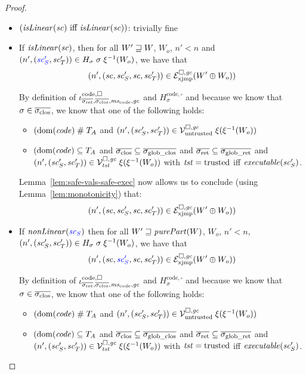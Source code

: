 \documentclass[a4paper]{article}
\begin{document}
\begin{proof}
\begin{itemize}
\begin{itemize}
   \item $(\isLinear{\vsc} \text{ iff } \isLinear{\vsc})$: trivially fine
      
   \item If $\isLinear{\vsc}$, then 
     for all $W' \future W$, $W_o$, $n' < n$ and $\npair[n']{\stpair[.]{\vsc_S'}{\vsc'_T}} \in H_\sigma \; \sigma \; \xi^{-1}(W_o)$, we have that 
     \begin{equation*}
       \npair[n']{(\vsc,\vsc_S',\vsc,\vsc_T')} \in \lrexj(W'\oplus W_o))
     \end{equation*}

     By definition of $\codereg{\sigrets,\sigcloss,\mscode,\gc}$ and $H^\mathrm{code,\square}_\sigma$ and because we know that $\sigma\in\sigcloss$, we know that
     one of the following holds:
     \begin{itemize}
     \item $(\dom(\code) \mathrel{\#} \ta$ and $\npair[n']{(\vsc_S',\vsc_T')} \in \lrv \; \xi(\xi^{-1}(W_o))$
     \item $(\dom(\code) \subseteq \ta$ and $\sigcloss\subseteq \gsigcloss$ and $\sigrets \subseteq \gsigrets$ and $\npair[n']{(\vsc_S',\vsc_T')} \in \lrvg{\trust} \; \xi(\xi^{-1}(W_o))$ with $\trust = \trusted$ iff $\exec{\vsc_S'}$.
     \end{itemize}

     Lemma~\ref{lem:safe-vals-safe-exec} now allows us to conclude (using Lemma~\ref{lem:monotonicity}) that:
     \begin{equation*}
       \npair[n']{(\vsc,\vsc_S',\vsc,\vsc_T')} \in \lrexj(W'\oplus W_o))
     \end{equation*}

   \item 
       If $\nonLinear{\src{\vsc_S}}$ then for all $W' \future \purePart{W}$, $W_o$, $n' < n$, $\npair[n']{(\vsc_S',\vsc'_T)} \in H_\sigma \; \sigma \; \xi^{-1}(W_o)$, we have that
       \begin{equation*}
         \npair[n']{(\vsc,\src{\vsc_S'},\vsc,\vsc_T')} \in \lrexj(W'\oplus W_o))
       \end{equation*}

     By definition of $\codereg{\sigrets,\sigcloss,\mscode,\gc}$ and $H^\mathrm{code,\square}_\sigma$ and because we know that $\sigma\in\sigcloss$, we know that
     one of the following holds:
     \begin{itemize}
     \item $(\dom(\code) \mathrel{\#} \ta$ and $\npair[n']{(\vsc_S',\vsc_T')} \in \lrv \; \xi(\xi^{-1}(W_o))$
     \item $(\dom(\code) \subseteq \ta$ and $\sigcloss\subseteq \gsigcloss$ and $\sigrets \subseteq \gsigrets$ and $\npair[n']{(\vsc_S',\vsc_T')} \in \lrvg{\trust} \; \xi(\xi^{-1}(W_o))$ with $\trust = \trusted$ iff $\exec{\vsc_S'}$.
     \end{itemize}


\end{itemize}
\end{itemize}
\end{proof}
\end{document}
